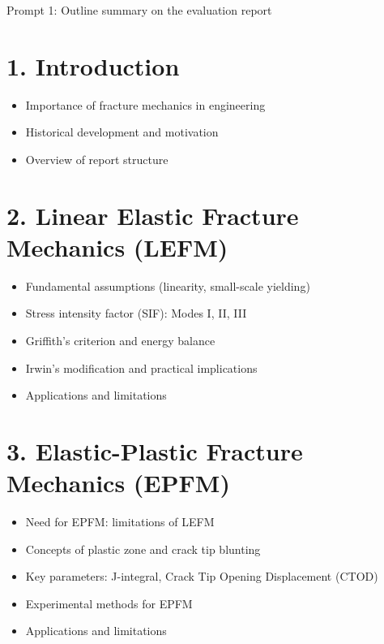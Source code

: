 \documentclass[12pt]{article}
\begin{document}
\newpage
\begin{summarybox}{Prompt 1: Outline summary on the evaluation report}
    
\section*{1. Introduction }
\begin{itemize}
    \item Importance of fracture mechanics in engineering
    \item Historical development and motivation
    \item Overview of report structure
\end{itemize}
\section*{2. Linear Elastic Fracture Mechanics (LEFM)}
\begin{itemize}
    \item Fundamental assumptions (linearity, small-scale yielding)
    \item Stress intensity factor (SIF): Modes I, II, III
    \item Griffith’s criterion and energy balance
    \item Irwin’s modification and practical implications
    \item Applications and limitations
\end{itemize}

\section*{3. Elastic-Plastic Fracture Mechanics (EPFM) }
\begin{itemize}
    \item Need for EPFM: limitations of LEFM
    \item Concepts of plastic zone and crack tip blunting
    \item Key parameters: J-integral, Crack Tip Opening Displacement (CTOD)
    \item Experimental methods for EPFM
    \item Applications and limitations
\end{itemize}

\end{summarybox}
\end{document}
